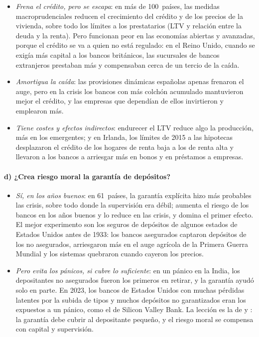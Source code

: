 \documentclass[11pt]{article}
\begin{document}
\begin{itemize}
\item \emph{Frena el crédito, pero se escapa}: en más de 100~países, las medidas macroprudenciales reducen el crecimiento del crédito y de los precios de la vivienda, sobre todo los límites a los prestatarios (LTV y relación entre la deuda y la renta)\nocite{CeruttiClaessensLaeven2017,AkinciOlmsteadRumsey2018}. Pero funcionan peor en las economías abiertas y avanzadas, porque el crédito se va a quien no está regulado: en el Reino Unido, cuando se exigía más capital a los bancos británicos, las sucursales de bancos extranjeros prestaban más y compensaban cerca de un tercio de la caída\nocite{AiyarCalomirisWieladek2014}.
\item \emph{Amortigua la caída}: las provisiones dinámicas españolas apenas frenaron el auge, pero en la crisis los bancos con más colchón acumulado mantuvieron mejor el crédito, y las empresas que dependían de ellos invirtieron y emplearon más\nocite{JimenezOngenaPeydroSaurina2017}.
\item \emph{Tiene costes y efectos indirectos}: endurecer el LTV reduce algo la producción, más en los emergentes\nocite{RichterSchularickShim2019}; y en Irlanda, los límites de 2015 a las hipotecas desplazaron el crédito de los hogares de renta baja a los de renta alta y llevaron a los bancos a arriesgar más en bonos y en préstamos a empresas\nocite{AcharyaEtAl2022Macroprudential}.
\end{itemize}

\paragraph{d) ¿Crea riesgo moral la garantía de depósitos?}

\begin{itemize}
\item \emph{Sí, en los años buenos}: en 61~países, la garantía explícita hizo más probables las crisis, sobre todo donde la supervisión era débil\nocite{DemirgucKuntDetragiache2002}; aumenta el riesgo de los bancos en los años buenos y lo reduce en las crisis, y domina el primer efecto\nocite{AnginerDemirgucKuntZhu2014}. El mejor experimento son los seguros de depósitos de algunos estados de Estados Unidos antes de 1933: los bancos asegurados captaron depósitos de los no asegurados, arriesgaron más en el auge agrícola de la Primera Guerra Mundial y los sistemas quebraron cuando cayeron los precios\nocite{CalomirisJaremski2019}.
\item \emph{Pero evita los pánicos, si cubre lo suficiente}: en un pánico en la India, los depositantes no asegurados fueron los primeros en retirar, y la garantía ayudó solo en parte\nocite{IyerPuri2012}. En 2023, los bancos de Estados Unidos con muchas pérdidas latentes por la subida de tipos y muchos depósitos no garantizados eran los expuestos a un pánico, como el de Silicon Valley Bank\nocite{JiangMatvosPiskorskiSeru2024}. La lección es la de  y : la garantía debe cubrir al depositante pequeño, y el riesgo moral se compensa con capital y supervisión.
\end{itemize}
\end{document}
